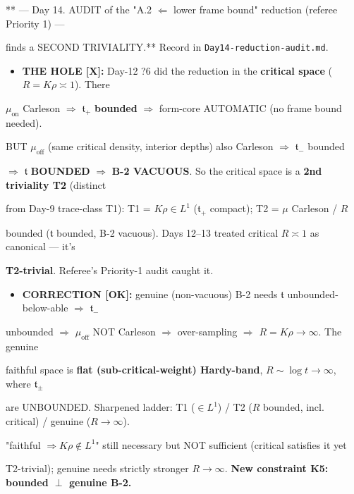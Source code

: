 \documentclass[10pt]{article}
\begin{document}
** --- Day 14. AUDIT of the "A.2 $\Leftarrow$ lower frame bound" reduction (referee Priority 1) ---\par
finds a SECOND TRIVIALITY.** Record in \texttt{Day14-reduction-audit.md}.\par
\begin{itemize}
\item \textbf{THE HOLE [X]:} Day-12 ?6 did the reduction in the \textbf{critical space} ($R=K\rho\asymp1$). There
\end{itemize}
  $\mu_{\mathrm{on}}$ Carleson \ensuremath{\Rightarrow} $\mathfrak t_+$ \textbf{bounded} \ensuremath{\Rightarrow} form-core AUTOMATIC (no frame bound needed).\par
  BUT $\mu_{\mathrm{off}}$ (same critical density, interior depths) also Carleson \ensuremath{\Rightarrow} $\mathfrak t_-$ bounded\par
  \ensuremath{\Rightarrow} $\mathfrak t$ \textbf{BOUNDED} \ensuremath{\Rightarrow} \textbf{B-2 VACUOUS}. So the critical space is a \textbf{2nd triviality T2} (distinct\par
  from Day-9 trace-class T1): T1 = $K\rho\in L^1$ ($\mathfrak t_+$ compact); T2 = $\mu$ Carleson / $R$\par
  bounded ($\mathfrak t$ bounded, B-2 vacuous). Days 12--13 treated critical $R\asymp1$ as canonical --- it's\par
  \textbf{T2-trivial}. Referee's Priority-1 audit caught it.\par
\begin{itemize}
\item \textbf{CORRECTION [OK]:} genuine (non-vacuous) B-2 needs $\mathfrak t$ unbounded-below-able \ensuremath{\Rightarrow} $\mathfrak t_-$
\end{itemize}
  unbounded \ensuremath{\Rightarrow} $\mu_{\mathrm{off}}$ NOT Carleson \ensuremath{\Rightarrow} over-sampling \ensuremath{\Rightarrow} \textbf{$R=K\rho\to\infty$}. The genuine\par
  faithful space is \textbf{flat (sub-critical-weight) Hardy-band}, $R\sim\log t\to\infty$, where $\mathfrak t_\pm$\par
  are UNBOUNDED. Sharpened ladder: T1 ($\in L^1$) / T2 ($R$ bounded, incl. critical) / genuine ($R\to\infty$).\par
  "faithful $\Rightarrow K\rho\notin L^1$" still necessary but NOT sufficient (critical satisfies it yet\par
  T2-trivial); genuine needs strictly stronger $R\to\infty$. \textbf{New constraint K5: bounded $\perp$ genuine B-2.}\par
\end{document}

